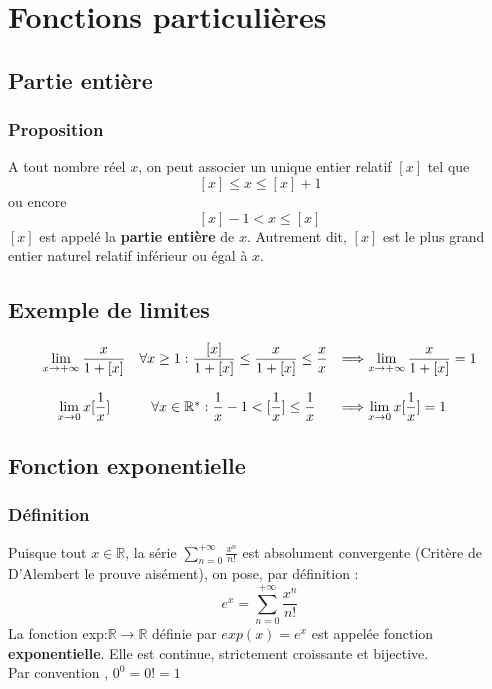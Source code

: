 \documentclass[oneside,11pt,french,table]{book}
\theoremstyle{definition}
\theoremstyle{plain}
\theoremstyle{remark}
\begin{document}
\section{Fonctions particulières }\label{fonctionsparticulieres}
 \subsection{Partie entière }
 \subsubsection{Proposition} A tout nombre réel $x$, on peut associer un unique entier relatif $[x]$ tel que $$  [x]\leq x \leq [x]+1$$ ou encore $$ [x]-1<x \leq [x]$$
 $[x]$ est appelé la \textbf{partie entière } de $x$. Autrement dit, $[x]$ est le plus grand entier naturel relatif inférieur ou égal à $x$.
 \subsection{Exemple de limites}
 \begin{equation*}
     \begin{array}{c c l}
          \lim\limits_{x \to +\infty}{\displaystyle\frac{x}{1+[x]}}& \forall x\geq 1:\displaystyle\frac{[x]}{1+[x]}\leq \displaystyle\frac{x}{1+[x]}\leq \displaystyle\frac{x}{x}& \Longrightarrow \lim\limits_{x \to +\infty}{\displaystyle\frac{x}{1+[x]}}=1   \\
          \\
           \lim\limits_{x \to 0}{x[\displaystyle\frac{1}{x}]}& \forall x\in\mathbb{R}^* : \displaystyle\frac{1}{x}-1<[\displaystyle\frac{1}{x}]\leq \displaystyle\frac{1}{x}& \Longrightarrow \lim\limits_{x \to 0}{x[\displaystyle\frac{1}{x}]}=1
     \end{array}
 \end{equation*}
 \subsection{Fonction exponentielle}
 \subsubsection{Définition} Puisque tout $x\in \mathbb{R}$, la série $\displaystyle\sum_{n=0}^{+\infty}\displaystyle\frac{x^n}{n!}$ est absolument convergente (Critère de D'Alembert le prouve aisément), on pose, par définition : $$e^x=\displaystyle\sum_{n=0}^{+\infty}\frac{x^n}{n!} $$
 La fonction exp:$\mathbb{R}\to \mathbb{R}$ définie par $exp(x)=e^x$ est appelée fonction \textbf{exponentielle}. Elle est continue, strictement croissante et bijective.\\
 Par convention , $0^0=0!=1$
\end{document}
